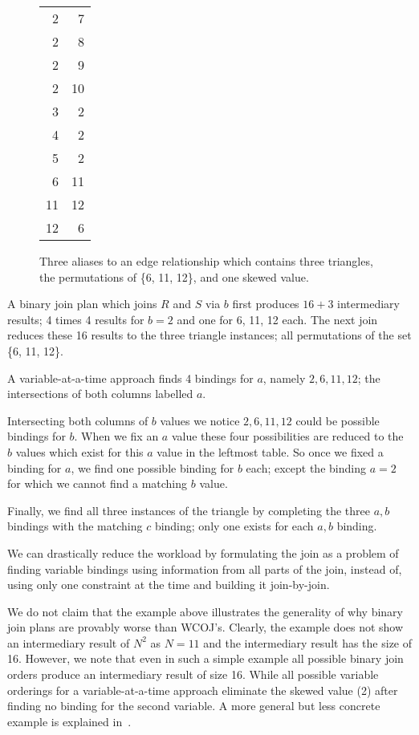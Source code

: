 \begin{figure}
{\begin{tabular}{rr}
        2 &  7 \\
        2 &  8 \\
        2 &  9 \\
        2 & 10 \\
        3 &  2 \\
        4 &  2 \\
        5 &  2 \\
        6 & 11 \\
        11 & 12 \\
        12 &  6 \\\bottomrule
    \end{tabular}
    }
    \caption{
    Three aliases to an edge relationship which contains three triangles, the permutations of \{6, 11, 12\},
    and one skewed value.
    }
    \label{fig:edge-rel-example}
\end{figure}

A binary join plan which joins $R$ and $S$ via $b$ first produces $16 + 3$ intermediary results;
4 times 4 results for $b = 2$ and one for 6, 11, 12 each.
The next join reduces these 16 results to the three triangle instances; all permutations of the set \{6, 11, 12\}.

A variable-at-a-time approach finds 4 bindings for $a$, namely  $2, 6, 11, 12$;
the intersections of both columns labelled $a$.

Intersecting both columns of $b$ values we notice $2, 6, 11, 12$ could be possible bindings for $b$.
When we fix an $a$ value these four possibilities are reduced to the $b$ values which exist for this
$a$ value in the leftmost table.
So once we fixed a binding for $a$, we find one possible binding for $b$ each;
except the binding $a = 2$ for which we cannot find a matching $b$ value.

Finally, we find all three instances of the triangle by completing the three $a, b$ bindings with
the matching $c$ binding;
only one exists for each $a, b$ binding.

We can drastically reduce the workload by formulating the join as a problem of
finding variable bindings using information from all parts of the join, instead of, using only one constraint at the time
and building it join-by-join.

We do not claim that the example above illustrates the generality of why binary join plans are provably worse than
\textsc{WCOJ}'s.
Clearly, the example does not show an intermediary result of $N^2$ as $N = 11$ and the intermediary result has the size of 16.
However, we note that even in such a simple example all possible binary join orders produce an intermediary result of size 16.
While all possible variable orderings for a variable-at-a-time approach eliminate the skewed value (2) after finding no binding
for the second variable.
A more general but less concrete example is explained in~\cite{skew-strikes-back}.

